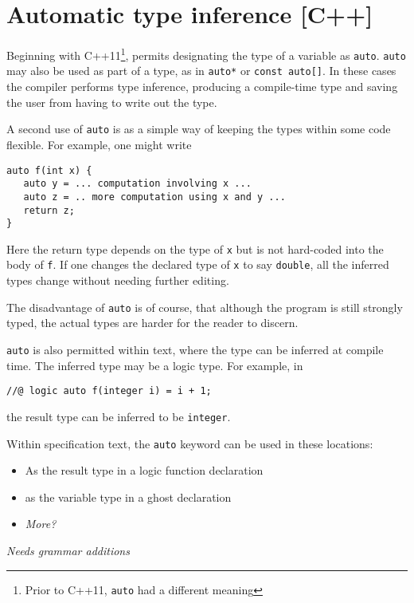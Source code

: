 \section{Automatic type inference [C++]}
\label{sec:auto}

Beginning with C++11\footnote{Prior to C++11, \lstinline|auto| had a different meaning}, \lang{} permits designating the type of a variable as
\lstinline|auto|.
 \lstinline|auto| may also be used as part of a type, as in \lstinline|auto*| or \lstinline|const auto[]|. In these cases the compiler performs type inference, producing a compile-time type and
saving the user from having to write out the type.

A second use of \lstinline|auto| is as a simple way of keeping the types
within some code flexible. For example, one might write
\begin{lstlisting}
auto f(int x) {
   auto y = ... computation involving x ...
   auto z = .. more computation using x and y ...
   return z;
}
\end{lstlisting}
Here the return type depends on the type of \lstinline|x| but is not hard-coded into the body of \lstinline|f|. If one changes the declared type of
\lstinline|x| to say \lstinline|double|, all the inferred types change without needing further editing.

The disadvantage of \lstinline|auto| is of course, that although the 
program is still strongly typed, the actual types are harder for the reader to discern.

\lstinline|auto| is also permitted within \NAME{} text, where the type can be inferred at compile time. The inferred type may be a logic type. For example, in
\begin{lstlisting}
//@ logic auto f(integer i) = i + 1;
\end{lstlisting}
the result type can be inferred to be \lstinline|integer|.

Within \NAME{} specification text, the \lstinline|auto| keyword can be used in these locations:
\begin{itemize}
	\item As the result type in a logic function declaration
	\item as the variable type in a ghost declaration
	\item \emph{More?}
\end{itemize}

\emph{Needs grammar additions}


